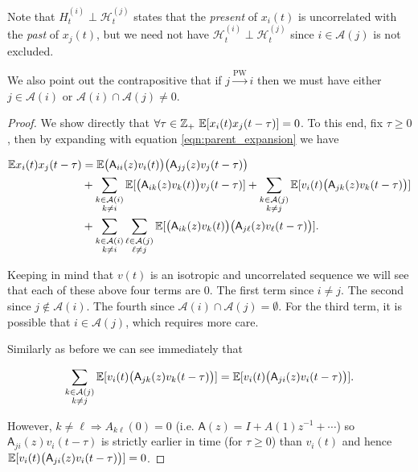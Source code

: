 \documentclass[12pt]{article}
\def\pwgc{\overset{\text{PW}}{\rightarrow}}  %
\def\A{\mathsf{A}}  %
\def\H{\mathcal{H}}  %
\newcommand{\anc}[1]{\mathcal{A}(#1)}  %
\begin{document}
\begin{remark}
  Note that $H_t^{(i)} \perp \H_t^{(j)}$ states that the
  \textit{present} of $x_i(t)$ is uncorrelated with the \textit{past}
  of $x_j(t)$, but we need not have $\H_t^{(i)} \perp \H_t^{(j)}$
  since $i \in \anc{j}$ is not excluded.

  We also point out the contrapositive that if $j \pwgc i$ then we
  must have either $j \in \anc{i}$ or $\anc{i} \cap \anc{j} \ne 0$.
\end{remark}

\begin{proof}
  We show directly that
  $\forall \tau \in \mathbb{Z}_+\ \mathbb{E}[x_i(t)x_j(t - \tau)] = 0$.  To this end,
  fix $\tau \ge 0$, then by expanding with equation \eqref{eqn:parent_expansion} we have

  \begin{align*}
    \E x_i(t)x_j(t - \tau) &= \E \big(\A_{ii}(z)v_i(t)\big)\big(\A_{jj}(z)v_j(t - \tau)\big)\\
    &+ \sum_{\substack{k \in \anc{i} \\ k \ne i}}\E[\big(\A_{ik}(z)v_k(t)\big)v_j(t - \tau)] + \sum_{\substack{k \in \anc{j} \\ k \ne j}}\E[v_i(t) \big(\A_{jk}(z) v_k(t - \tau)\big)]\\
    &+ \sum_{\substack{k \in \anc{i} \\ k \ne i}}\sum_{\substack{\ell \in \anc{j} \\ \ell \ne j}}\E[\big(\A_{ik}(z)v_k(t)\big)\big(\A_{j\ell}(z)v_\ell(t - \tau)\big)].
  \end{align*}

  
  Keeping in mind that $v(t)$ is an isotropic and uncorrelated
  sequence we will see that each of these above four terms are 0.  The
  first term since $i \ne j$.  The second since $j \not\in \anc{i}$.
  The fourth since $\anc{i} \cap \anc{j} = \emptyset$.  For the third
  term, it is possible that $i \in \anc{j}$, which requires more care.

  Similarly as before we can see immediately that

  \begin{equation*}
    \sum_{\substack{k \in \anc{j} \\ k \ne j}}\E[v_i(t) \big(\A_{jk}(z) v_k(t - \tau)\big)] = \E[v_i(t)\big(\A_{ji}(z)v_i(t - \tau)\big)].
  \end{equation*}

  However, $k \ne \ell \Rightarrow A_{k\ell}(0) = 0$ (i.e.
  $\A(z) = I + A(1)z^{-1} + \cdots$) so $\A_{ji}(z)v_i(t - \tau)$ is
  strictly earlier in time (for $\tau \ge 0$) than $v_i(t)$ and hence
  $\E[v_i(t)\big(\A_{ji}(z)v_i(t - \tau)\big)] = 0$.
\end{proof}
\end{document}

